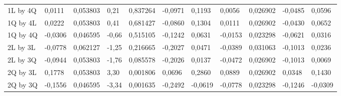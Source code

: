 \begin{table}[H]
{\begin{tabular}{lllllllllll}
\rowcolor[HTML]{FFFFFF} 
1L by 4Q       & {\color[HTML]{333333} 0,0111}   & {\color[HTML]{333333} 0,053803} & {\color[HTML]{333333} 0,21}     & {\color[HTML]{333333} 0,837264} & {\color[HTML]{333333} -0,0971}  & {\color[HTML]{333333} 0,1193}   & {\color[HTML]{333333} 0,0056}   & {\color[HTML]{333333} 0,026902} & {\color[HTML]{333333} -0,0485}  & {\color[HTML]{333333} 0,0596}   \\
\rowcolor[HTML]{FFFFFF} 
1Q by 4L       & {\color[HTML]{333333} 0,0222}   & {\color[HTML]{333333} 0,053803} & {\color[HTML]{333333} 0,41}     & {\color[HTML]{333333} 0,681427} & {\color[HTML]{333333} -0,0860}  & {\color[HTML]{333333} 0,1304}   & {\color[HTML]{333333} 0,0111}   & {\color[HTML]{333333} 0,026902} & {\color[HTML]{333333} -0,0430}  & {\color[HTML]{333333} 0,0652}   \\
\rowcolor[HTML]{FFFFFF} 
1Q by 4Q       & {\color[HTML]{333333} -0,0306}  & {\color[HTML]{333333} 0,046595} & {\color[HTML]{333333} -0,66}    & {\color[HTML]{333333} 0,515105} & {\color[HTML]{333333} -0,1242}  & {\color[HTML]{333333} 0,0631}   & {\color[HTML]{333333} -0,0153}  & {\color[HTML]{333333} 0,023298} & {\color[HTML]{333333} -0,0621}  & {\color[HTML]{333333} 0,0316}   \\
\rowcolor[HTML]{FFFFFF} 
2L by 3L       & {\color[HTML]{333333} -0,0778}  & {\color[HTML]{333333} 0,062127} & {\color[HTML]{333333} -1,25}    & {\color[HTML]{333333} 0,216665} & {\color[HTML]{333333} -0,2027}  & {\color[HTML]{333333} 0,0471}   & {\color[HTML]{333333} -0,0389}  & {\color[HTML]{333333} 0,031063} & {\color[HTML]{333333} -0,1013}  & {\color[HTML]{333333} 0,0236}   \\
\rowcolor[HTML]{FFFFFF} 
2L by 3Q       & {\color[HTML]{333333} -0,0944}  & {\color[HTML]{333333} 0,053803} & {\color[HTML]{333333} -1,76}    & {\color[HTML]{333333} 0,085578} & {\color[HTML]{333333} -0,2026}  & {\color[HTML]{333333} 0,0137}   & {\color[HTML]{333333} -0,0472}  & {\color[HTML]{333333} 0,026902} & {\color[HTML]{333333} -0,1013}  & {\color[HTML]{333333} 0,0069}   \\
\rowcolor[HTML]{FFFFFF} 
2Q by 3L       & {\color[HTML]{FF0000} 0,1778}   & {\color[HTML]{FF0000} 0,053803} & {\color[HTML]{FF0000} 3,30}     & {\color[HTML]{FF0000} 0,001806} & {\color[HTML]{FF0000} 0,0696}   & {\color[HTML]{FF0000} 0,2860}   & {\color[HTML]{FF0000} 0,0889}   & {\color[HTML]{FF0000} 0,026902} & {\color[HTML]{FF0000} 0,0348}   & {\color[HTML]{FF0000} 0,1430}   \\
\rowcolor[HTML]{FFFFFF} 
2Q by 3Q       & {\color[HTML]{FF0000} -0,1556}  & {\color[HTML]{FF0000} 0,046595} & {\color[HTML]{FF0000} -3,34}    & {\color[HTML]{FF0000} 0,001635} & {\color[HTML]{FF0000} -0,2492}  & {\color[HTML]{FF0000} -0,0619}  & {\color[HTML]{FF0000} -0,0778}  & {\color[HTML]{FF0000} 0,023298} & {\color[HTML]{FF0000} -0,1246}  & {\color[HTML]{FF0000} -0,0309}  \\

\end{tabular}}
\end{table}
